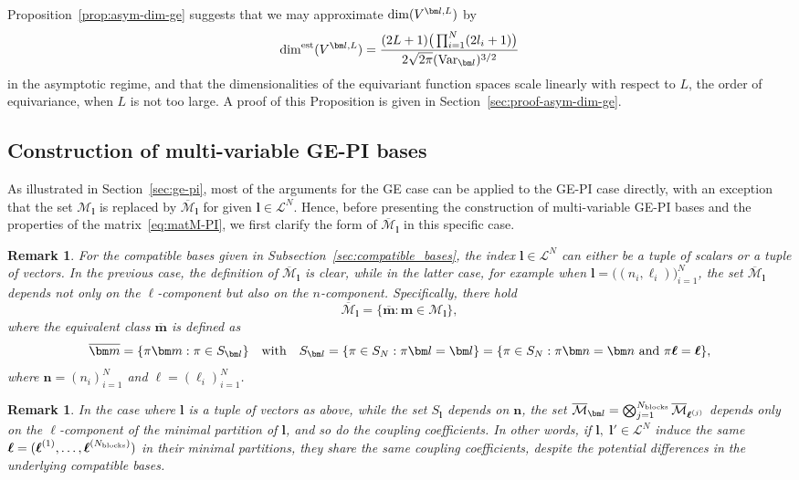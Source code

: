 \documentclass{article}
\newcommand{\dimge}[2]{\dim(V^{#1,#2})}
\newcommand{\dimgeest}[2]{\dim^{\textup{est}}(V^{#1,#2})}
\newtheorem{remark}[theorem]{Remark}
\numberwithin{equation}{section}
\def\Nb{{N_{\rm blocks}}}
\def\bl{{\bm l}}
\def\bbm{{\bm m}}
\def\bn{{\bm n}}
\def\obm{{\overline\bbm}}
\def\calM{\mathcal{M}}
\def\calL{\mathcal{L}}
\def\oMl{\overline{\calM}_\bl}
\def\dim{{{\rm dim}}}
\begin{document}
Proposition~\ref{prop:asym-dim-ge} suggests that we may approximate $\dimge{\bl}{L}$ by 
\[ \dimgeest{\bl}{L} = \frac{(2L+1)\big(\prod_{i=1}^N(2l_i+1)\big)}{2\sqrt{2\pi}(\textup{Var}_\bl)^{3/2}} \]
in the asymptotic regime, and that the dimensionalities of the equivariant function spaces scale linearly with respect to $L$, the order of equivariance, when $L$ is not too large. A proof of this Proposition is given in Section~\ref{sec:proof-asym-dim-ge}.



\subsection{Construction of multi-variable GE-PI bases}
As illustrated in Section~\ref{sec:ge-pi}, most of the arguments for the GE case can be applied to the GE-PI case directly, with an exception that the set $\calM_\bl$ is replaced by $\oMl$ for given $\bl\in\calL^N$. Hence, before presenting the construction of multi-variable GE-PI bases and the properties of the matrix~\eqref{eq:matM-PI}, 
we first clarify the form of $\oMl$ in this specific case. 

\begin{remark}
For the compatible bases given in Subsection~\ref{sec:compatible_bases}, the index $\bl\in\calL^N$ can either be a tuple of scalars or a tuple of vectors. In the previous case, the definition of $\oMl$ is clear, 
while in the latter case, for example when $\bl = \big((n_i,\ell_i)\big)_{i=1}^N$, the set $\oMl$ depends not only on the $\ell$-component but also on the $n$-component. Specifically, there hold
\[
    \oMl = \big\{\obm:\bbm\in\calM_\bl\big\},
\]
where the equivalent class $\obm$ is defined as
\begin{equation*}
    \obm  = \{\pi\bbm:\pi\in S_\bl\}
    \quad\text{with}\quad 
    S_\bl = \{\pi\in S_N:\pi\bl=\bl\} = \{\pi\in S_N: \pi\bn=\bn \textup{ and } \pi\boldsymbol{\ell}=\boldsymbol{\ell}\},
\end{equation*}
where $\bn=\left(n_i\right)_{i=1}^N$ and $\boldsymbol{\ell}=\left(\ell_i\right)_{i=1}^N$.
\end{remark}

\begin{remark}\label{rem:id-ell-blocks}
    In the case where $\bl$ is a tuple of vectors as above,  while the set $S_\bl$ depends on $\bn$, the set $\oMl = \bigotimes_{j=1}^\Nb \overline{\calM}_{\boldsymbol{\ell}^{(j)}}$ depends only on the $\boldsymbol\ell$-component of the minimal partition of $\bl$, and so do the coupling coefficients. In other words, if $\bl,\;\bl'\in\calL^N$ induce the same $\boldsymbol\ell = (\boldsymbol\ell^{(1)},\ldots,{\boldsymbol\ell}^{(\Nb)})$ in their minimal partitions, they share the same coupling coefficients, despite the potential differences in the underlying compatible bases. 
\end{remark}
\end{document}

